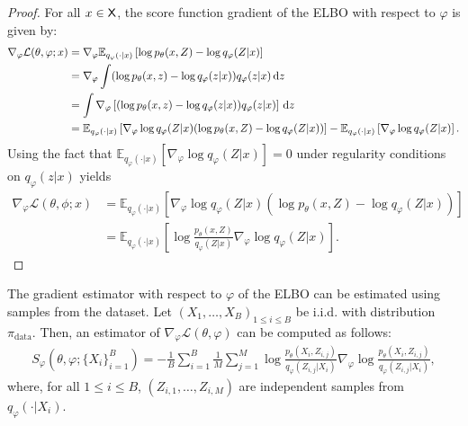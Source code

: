 \documentclass[english,graybox,envcountchap,envcountsame,sectrefs,shortlabels]{svmono}
\theoremstyle{style}
\newcommand{\eqsp}{}
\begin{document}
\begin{proof}
For all $x \in \mathsf{X}$, the score function gradient of the ELBO with respect to $\varphi$ is given by:
\begin{align*}
\nabla_{\varphi} \mathcal{L}(\theta, \varphi; x) &= \nabla_{\varphi} \mathbb{E}_{q_{\varphi}(\cdot|x)}\left[ \log p_{\theta}(x, Z) - \log q_{\varphi}(Z|x)\right] \\
&= \nabla_{\varphi} \int (\log p_{\theta}(x, z) - \log q_{\varphi}(z|x)) q_{\varphi}(z|x) \, \rmd z  \\
&= \int \nabla_{\varphi}\left[(\log p_{\theta}(x, z) - \log q_{\varphi}(z|x)) q_{\varphi}(z|x)\right] \, \rmd z  \\
&= \mathbb{E}_{q_{\varphi}(\cdot|x)}\left[ \nabla_{\varphi} \log q_{\varphi}(Z|x) (\log p_{\theta}(x, Z) - \log q_{\varphi}(Z|x)) \right] - \mathbb{E}_{q_{\varphi}(\cdot|x)}\left[\nabla_{\varphi} \log q_{\varphi}(Z|x)\right]\eqsp.
\end{align*}
Using the fact that $\mathbb{E}_{q_{\varphi}(\cdot|x)}\left[\nabla_{\varphi} \log q_{\varphi}(Z|x)\right]=0$ under regularity conditions on $q_{\varphi}(z|x)$ yields
\begin{align*}
\nabla_{\varphi} \mathcal{L}(\theta, \phi; x) &= \mathbb{E}_{q_{\varphi}(\cdot|x)}\left[ \nabla_{\varphi} \log q_{\varphi}(Z|x) (\log p_{\theta}(x, Z) - \log q_{\varphi}(Z|x)) \right] \\
&= \mathbb{E}_{q_{\varphi}(\cdot|x)}\left[ \log \frac{p_{\theta}(x, Z)}{q_{\varphi}(Z|x)} \nabla_{\varphi} \log q_{\varphi}(Z|x) \right]\eqsp.
\end{align*}
\end{proof}
The gradient estimator with respect to $\varphi$ of the ELBO can be estimated using samples from the dataset. Let  $(X_1,\ldots,X_B)_{1\leqslant i \leqslant B}$ be i.i.d. with distribution $\pi_{\mathrm{data}}$. Then, an estimator of $\nabla_{\varphi} \mathcal{L}(\theta, \varphi)$  can be computed as follows:
\begin{align} \label{eq:grad_estimator_score_phi}
S_{\varphi}(\theta, \varphi; \{X_i\}_{i=1}^B) = -\frac{1}{B} \sum_{i=1}^{B} \frac{1}{M} \sum_{j=1}^{M} \log \frac{p_{\theta}(X_i, Z_{i,j})}{q_{\varphi}(Z_{i,j} | X_i)} \nabla_{\varphi} \log \frac{p_{\theta}(X_i, Z_{i,j})}{q_{\varphi}(Z_{i,j} | X_i)}\eqsp,
\end{align}
where, for all $1 \leq i \leq B$,  $(Z_{i,1},\ldots, Z_{i,M})$ are independent samples from $q_{\varphi}(\cdot|X_i)$.
\end{document}
